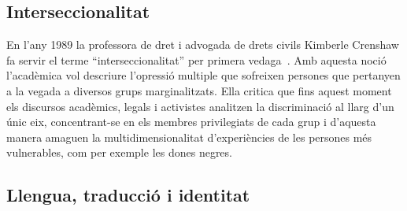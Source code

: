 \begin{comment}
""Aquests nou[sic!] catalans parles català, el van aprendre sense adonar-se'n. Molts el parles de manera natural i quotidiana, perquè sí, i altres per afany de sentir-se catalans de debò"" (p.17)

""Parlen un català gruixut, groller i vulgar[...] Desconeixen la gramàtica catalana. No saben llegir en aquest idioma. Escriure'l, encara menys. Però no n'hi ha per a escandaltzar-se'n. Infinitat de catalans d'origen, que s'expressen en català, que parlen en català i que viuen en català, llegiexen en castellà i escriuen les seves cartes en castellà."" (p.18)

""Tota aquesta gent no s'adona de la seva aclimatació. "Són" catalans fins a cert punt. "No" són catalans, també fins a cert punt. No és una qüestió d'honor ni de principis."" (p.19)

"Aquells immigrants murcians no havien arribat a Catalunya com a colonitzadors. Tampoc, o molt febement, com a invasors o peoners. Havien vingut a treballar i a menjar, senzillament, perquè a la seva terra es morien de gana [...] Avui dia, tots s'han integrat, i alguns, ultrapassant o sobrepujant aquesta integració, s'han tornat furibunds catalanistes. [...] Aquesta esperiència pot demostrar o permetre d'esperar que amb els immigrants d'ara passarà el mateixo poc més o menys." (p.32)

"el que passa és que no acabem de decidir-nos a anomenar catalans els qui han nascut aquí de pares de fora" (p.34)

\end{comment}

\subsection{Interseccionalitat}
En l'any 1989 la professora de dret i advogada de drets civils Kimberle Crenshaw fa servir el terme ``interseccionalitat'' per primera vedaga~\autocite{Crenshaw1989}.
Amb aquesta noció l'acadèmica vol descriure l'opressió multiple que sofreixen persones que pertanyen a la vegada a diversos grups marginalitzats.
Ella critica que fins aquest moment els discursos acadèmics, legals i activistes analitzen la discriminació al llarg d'un únic eix,
concentrant-se en els membres privilegiats de cada grup i d'aquesta manera amaguen la multidimensionalitat d'experiències de les persones més vulnerables, com per exemple les dones negres.

\subsection{Llengua, traducció i identitat}

